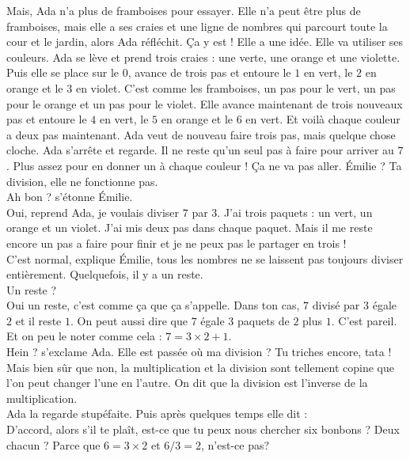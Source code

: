 Mais, Ada n'a plus de framboises pour essayer. Elle n'a peut être plus de framboises, mais elle a ses craies et une ligne de nombres qui parcourt toute la cour et le jardin, alors Ada réfléchit. Ça y est ! Elle a une idée. Elle va utiliser ses couleurs.
Ada se lève et prend trois craies : une verte, une orange et une violette. Puis elle se place sur le $0$, avance de trois pas et entoure le $1$ en vert, le $2$ en orange et le $3$ en violet. C'est comme les framboises, un pas pour le vert, un pas pour le orange et un pas pour le violet.
Elle avance maintenant de trois nouveaux pas et entoure le $4$ en vert, le $5$ en orange et le $6$ en vert. Et voilà chaque couleur a deux pas maintenant.
Ada veut de nouveau faire trois pas, mais quelque chose cloche. Ada s'arrête et regarde. Il ne reste qu'un seul pas à faire pour arriver au $7$. Plus assez pour en donner un à chaque couleur ! Ça ne va pas aller.
\guillemotleft Émilie ? Ta division, elle ne fonctionne pas.\\
\mdash Ah bon ? s'étonne Émilie. \\
\mdash Oui, reprend Ada, je voulais diviser $7$ par $3$. J'ai trois paquets : un vert, un orange et un violet. J'ai mis deux pas dans chaque paquet. Mais il me reste encore un pas a faire pour finir et je ne peux pas le partager en trois !\\
\mdash C'est normal, explique Émilie, tous les nombres ne se laissent pas toujours diviser entièrement. Quelquefois, il y a un reste. \\
\mdash Un reste ? \\
\mdash Oui un reste, c'est comme ça que ça s'appelle. Dans ton cas, $7$ divisé par $3$ égale $2$ et il reste $1$. On peut aussi dire que $7$ égale $3$ paquets de $2$ plus $1$. C'est pareil. Et on peu le noter comme cela : $7=3\times2+1$. \\
\mdash Hein ? s'exclame Ada. Elle est passée où ma division ? Tu triches encore, tata ! \\
\mdash Mais bien sûr que non, la multiplication et la division sont tellement copine que l'on peut changer l'une en l'autre. On dit que la division est l'inverse de la multiplication. \guillemotright\\
Ada la regarde stupéfaite. Puis après quelques temps elle dit : \\
\guillemotleft D'accord, alors s'il te plaît, est-ce que tu peux nous chercher six bonbons ? Deux chacun ? Parce que $6 = 3 \times 2$ et $6 / 3 = 2$, n'est-ce pas? \guillemotright 

